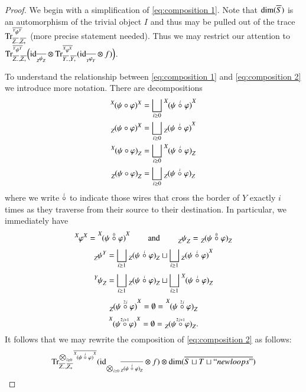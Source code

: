 \documentclass{amsart}
\def\tn{\textnormal}
\def\dim{\tn{dim}}
\def\Trace{\tn{Tr}}
\def\hsp{\hspace{.3in}}
\def\ol{\overline}
\def\id{\tn{id}}
\newcommand{\feeddd}[3]{{\tensor*[^{#2}_{\color{white}{!}}]{{#1}}{^{#3}}}}%
\newcommand{\feeddc}[3]{{\tensor*[^{#2}]{{#1}}{_{#3}}}}
\newcommand{\feedcd}[3]{{\tensor*[_{#2}]{{#1}}{^{#3}}}}
\newcommand{\feedcc}[3]{{\tensor*[^{\color{white}{!}}_{#2}]{{#1}}{_{#3}}}}
\theoremstyle{remark}
\theoremstyle{definition}
\begin{document}
\begin{proof}
We begin with a simplification of \eqref{eq:composition 1}.  Note that $\dim(\ol{S})$ is an automorphism of the trivial object $I$ and thus may be pulled out of the trace $\Trace^{\ol{\feeddd{\psi}{Y}{Y}}}_{\ol{Z_-},\ol{Z_+}}$ (more precise statement needed).  Thus we may restrict our attention to $\Trace^{\ol{\feeddd{\psi}{Y}{Y}}}_{\ol{Z_-},\ol{Z_+}}\Big(\id_{\ol{\feedcc{\psi}{Z}{Z}}}\otimes\Trace^{\ol{\feeddd{\varphi}{X}{X}}}_{\ol{Y_-},\ol{Y_+}}(\id_{\ol{\feedcc{\varphi}{Y}{Y}}}\otimes f)\Big)$.

To understand the relationship between \eqref{eq:composition 1} and \eqref{eq:composition 2} we introduce more notation.  There are decompositions
\begin{align*}
 \feeddd{(\psi\circ\varphi)}{X}{X}&=\bigsqcup_{i\ge0}\feeddd{(\psi\;\accentset{i}{\circ}\;\varphi)}{X}{X}\\
 \feedcd{(\psi\circ\varphi)}{Z}{X}&=\bigsqcup_{i\ge0}\feedcd{(\psi\;\accentset{i}{\circ}\;\varphi)}{Z}{X}\\
 \feeddc{(\psi\circ\varphi)}{X}{Z}&=\bigsqcup_{i\ge0}\feeddc{(\psi\;\accentset{i}{\circ}\;\varphi)}{X}{Z}\\
 \feedcc{(\psi\circ\varphi)}{Z}{Z}&=\bigsqcup_{i\ge0}\feedcc{(\psi\;\accentset{i}{\circ}\;\varphi)}{Z}{Z}\\
\end{align*}
where we write $\accentset{i}{\circ}$ to indicate those wires that cross the border of $Y$ exactly $i$ times as they traverse from their source to their destination.  In particular, we immediately have
\[\feeddd{\varphi}{X}{X}=\feeddd{(\psi\;\accentset{0}{\circ}\;\varphi)}{X}{X}\hsp\tn{and}\hsp\feedcc{\psi}{Z}{Z}=\feedcc{(\psi\;\accentset{0}{\circ}\;\varphi)}{Z}{Z}\]
\[\feedcd{\psi}{Z}{Y}=\bigsqcup_{i\ge1}\feedcc{(\psi\;\accentset{i}{\circ}\;\varphi)}{Z}{Z}\sqcup\bigsqcup_{i\ge1}\feedcd{(\psi\;\accentset{i}{\circ}\;\varphi)}{Z}{X}\]
\[\feeddc{\psi}{Y}{Z}=\bigsqcup_{i\ge1}\feedcc{(\psi\;\accentset{i}{\circ}\;\varphi)}{Z}{Z}\sqcup\bigsqcup_{i\ge1}\feeddc{(\psi\;\accentset{i}{\circ}\;\varphi)}{X}{Z}\]
\[\feedcd{(\psi\;\accentset{2j}{\circ}\;\varphi)}{Z}{X}=\emptyset=\feeddc{(\psi\;\accentset{2j}{\circ}\;\varphi)}{X}{Z}\]
\[\feeddd{(\psi\;\accentset{2j+1}{\circ}\;\varphi)}{X}{X}=\emptyset=\feedcc{(\psi\;\accentset{2j+1}{\circ}\;\varphi)}{Z}{Z}.\]
It follows that we may rewrite the composition of \eqref{eq:composition 2} as follows:
\begin{align*}
 &\Trace^{\bigotimes_{i\ge0}\ol{\feeddd{(\psi\;\accentset{i}{\circ}\;\varphi)}{X}{X}}}_{\ol{Z_-},\ol{Z_+}}(\id_{\bigotimes_{i\ge0}\ol{\feedcc{(\psi\;\accentset{i}{\circ}\;\varphi)}{Z}{Z}}}\otimes f)\otimes\dim(\ol{S\sqcup T\sqcup ``newloops"})\\

\end{align*}
\end{proof}
\end{document}
